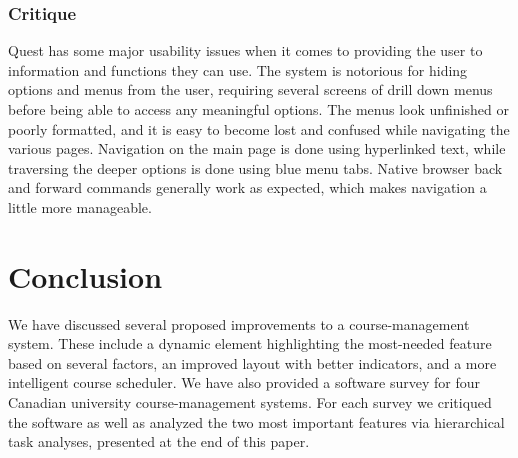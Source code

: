 \documentclass[10pt]{article}
\begin{document}
\begin{multicols}{2}
\subsubsection*{Critique}
Quest has some major usability issues when it comes to providing the user to 
information and functions they can use. The system is notorious for hiding 
options and menus from the user, requiring several screens of drill down menus 
before being able to access any meaningful options. The menus look unfinished or 
poorly formatted, and it is easy to become lost and confused while navigating 
the various pages. Navigation on the main page is done using hyperlinked text, 
while traversing the deeper options is done using blue menu tabs. Native browser 
back and forward commands generally work as expected, which makes navigation a 
little more manageable. 

\section*{Conclusion}
We have discussed several proposed improvements to a course-management system. 
These include a dynamic element highlighting the most-needed feature based on 
several factors, an improved layout with better indicators, and a more 
intelligent course scheduler. We have also provided a software survey for four 
Canadian university course-management systems. For each survey we critiqued the 
software as well as analyzed the two most important features via hierarchical 
task analyses, presented at the end of this paper.

\end{multicols}

\newpage
\end{document}
